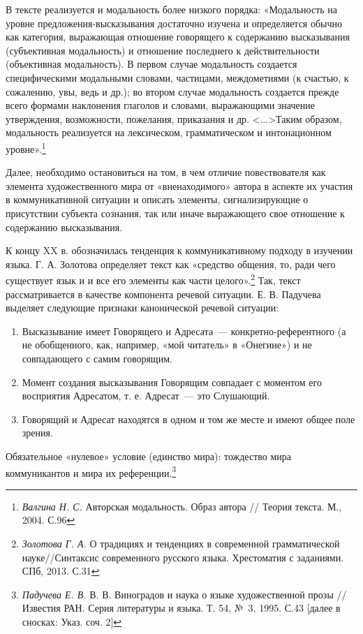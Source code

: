 \documentclass{kursa4}
\begin{document}
      В тексте реализуется и модальность более низкого порядка:
      «Модальность на уровне предложения-высказывания достаточно изучена и
      определяется обычно как категория, выражающая отношение говорящего к
      содержанию высказывания (субъективная модальность) и отношение
      последнего к действительности (объективная модальность). В первом
      случае модальность создается специфическими модальными словами,
      частицами, междометиями (к счастью, к сожалению, увы, ведь и др.); во
      втором случае модальность создается прежде всего формами наклонения
      глаголов и словами, выражающими значение утверждения, возможности,
      пожелания, приказания и др. \textless{}...\textgreater{}Таким образом,
      модальность реализуется на лексическом, грамматическом и интонационном
      уровне».\footnote{\textit{{Валгина Н. С.
      }}{Авторская модальность. Образ автора // Теория
      текста. М., 2004. С.96}} 

      Далее, необходимо остановиться на том, в чем отличие повествователя
      как элемента художественного мира от «вненаходимого» автора в аспекте
      их участия в коммуникативной ситуации и описать элементы,
      сигнализирующие о присутствии субъекта сознания, так или иначе
      выражающего свое отношение к содержанию высказывания. 

      К концу XX в. обозначилась тенденция к коммуникативному подходу в
      изучении языка. Г. А. Золотова определяет текст как «средство общения,
      то, ради чего существует язык и и все его элементы как части
      целого».\footnote{\textit{{Золотова Г. А.
      }}{О традициях и тенденциях в современной
      грамматической науке//Синтаксис современного русского языка.
      Хрестоматия с заданиями. СПб, 2013. С.31}} Так, текст рассматривается в
      качестве компонента речевой ситуации. \newline
      Е. В. Падучева выделяет следующие признаки канонической речевой
      ситуации: 

      \begin{enumerate}
      \item Высказывание имеет Говорящего и Адресата~--- конкретно-референтного
      (а не обобщенного, как, например, «мой читатель» в «Онегине») и не
      совпадающего с самим говорящим. 
      \item Момент создания высказывания Говорящим совпадает с моментом его
      восприятия Адресатом, т. е. Адресат~--- это Слушающий. 
      \item Говорящий и Адресат находятся в одном и том же месте и имеют общее
      поле зрения. 
      \end{enumerate}
      Обязательное «нулевое» условие (единство мира): тождество мира
      коммуникантов и мира их референции.\footnote{\textit{{
      Падучева Е. В. }}{В. В. Виноградов и наука о языке
      художественной прозы // Известия РАН. Серия литературы и языка. Т. 54,
      № 3, 1995. С.43 [далее в сносках: Указ. соч. 2]}} 
\end{document}
